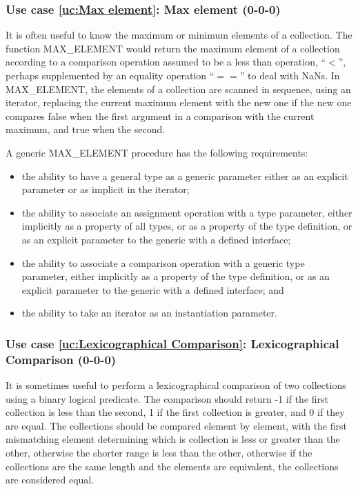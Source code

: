 \documentclass{article}
\newcounter{usecase}
\newcounter{requirement}
\newcommand{\newusecase}[2]{
\refstepcounter{usecase}\label{uc:#1}
\subsubsection{Use case \ref{uc:#1}: #1 (#2)}}
\begin{document}
\newusecase{Max element}{0-0-0}
It  is often useful to know the maximum or minimum elements of a
collection. The function {\rm MAX\_ELEMENT} would return the maximum
element of a collection according to a comparison operation assumed to
be a less than operation, ``$<$'', perhaps supplemented by an equality
operation ``$==$'' to deal with {\rm NaN}s.  In {\rm MAX\_ELEMENT},
the elements of a collection are scanned in sequence, using an
iterator, replacing the current maximum element with the new one if
the new one compares false when the first argument in a comparison
with the current maximum, and true when  the second.

A generic {\rm MAX\_ELEMENT} procedure has the following
requirements:
\begin{itemize}
\item the ability to have a general type as a generic parameter
  either as an explicit parameter or as implicit in the iterator;

\item the ability to associate an assignment operation with a type
  parameter, either implicitly as a property of all types, or
  as a property of the type definition, or as an explicit parameter to
  the generic with a defined interface;

\item the ability to associate a comparison operation with a
  generic type parameter, either implicitly
  as a property of the type definition, or as an explicit parameter to
  the generic with a defined interface; and

\item the ability to take an iterator as an instantiation
  parameter.

\end{itemize}

\newusecase{Lexicographical Comparison}{0-0-0}
It is sometimes useful to perform a lexicographical comparison of two
collections using a binary logical predicate. The comparison  should
return -1 if the first collection is less than the second, 1 if the
first collection is greater, and 0 if they are equal. The collections
should be compared element by  element, with the first mismatching
element determining which is collection is less or greater than the
other, otherwise the shorter range is less than the other, otherwise
if the collections are the same length and the elements are
equivalent, the collections are considered equal.
\end{document}
